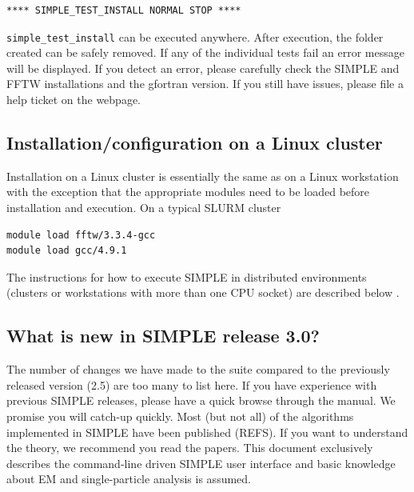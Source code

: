 \documentclass[a4paper,11pt]{article}
\begin{document}
\begin{Verbatim}[commandchars=+\[\],fontsize=\small,breaklines=true]
 **** SIMPLE_TEST_INSTALL NORMAL STOP ****
\end{Verbatim}

\noindent{}\texttt{simple\_test\_install} can be executed anywhere. After execution, the folder created can be safely removed. If any of the individual 
tests fail an error message will be displayed. If you detect an error, please carefully check the SIMPLE and FFTW installations 
and the gfortran version. If you still have issues, please file a help ticket on the webpage.

\subsection{Installation/configuration on a Linux cluster}

Installation on a Linux cluster is essentially the same as on a Linux workstation with the exception that the appropriate modules need to be loaded before installation and execution. On a typical SLURM cluster
\begin{Verbatim}[commandchars=+\[\],fontsize=\small,breaklines=true]
module load fftw/3.3.4-gcc
module load gcc/4.9.1
\end{Verbatim}
The instructions for how to execute SIMPLE in distributed environments (clusters or workstations with more than one CPU socket) are described below \label{distr}.

\subsection{What is new in SIMPLE release 3.0?}
The number of changes we have made to the suite compared to the previously released version (2.5) are too many to list here. If you have experience with previous SIMPLE releases, please have a quick browse through the manual. We promise you will catch-up quickly. Most (but not all) of the algorithms implemented in SIMPLE have been published (REFS). If you want to understand the theory, we recommend you read the papers. This document exclusively describes the command-line driven SIMPLE user interface and basic knowledge about EM and single-particle analysis is assumed. 
\end{document}
